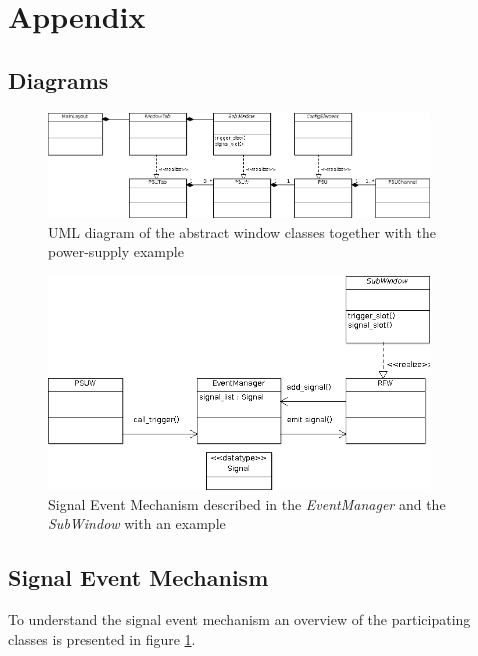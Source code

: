 \documentclass[10pt,a4paper]{article}
\begin{document}
\newpage
\appendix

\section{Appendix}

\subsection{Diagrams}

\begin{figure}[H]
\centering
\includegraphics[width=0.9\textwidth]{./A_MainLayout.png}
\caption{UML diagram of the abstract window classes together with the power-supply example}
\end{figure}

\begin{figure}[H]
\centering
\includegraphics[width=0.9\textwidth]{./A_EventManager.png}
\caption{Signal Event Mechanism described in the \textit{EventManager} and the \textit{SubWindow} with an example}
\label{f:signal_event_mechanism}
\end{figure}

\subsection{Signal Event Mechanism}

To understand the signal event mechanism an overview of the participating classes is presented in figure \ref{f:signal_event_mechanism}. 
\end{document}
